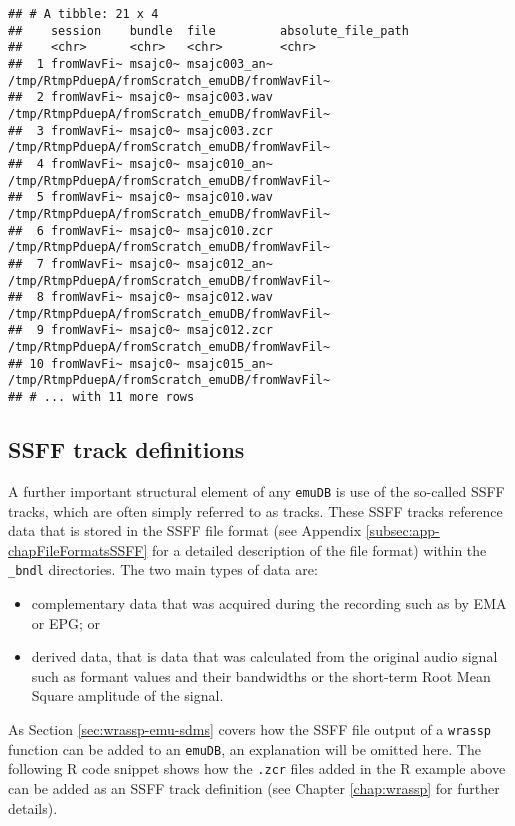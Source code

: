 \documentclass[
]{book}
\providecommand{\tightlist}{%
  \setlength{\itemsep}{0pt}\setlength{\parskip}{0pt}}
\begin{document}
\begin{verbatim}
## # A tibble: 21 x 4
##    session    bundle  file         absolute_file_path                           
##    <chr>      <chr>   <chr>        <chr>                                        
##  1 fromWavFi~ msajc0~ msajc003_an~ /tmp/RtmpPduepA/fromScratch_emuDB/fromWavFil~
##  2 fromWavFi~ msajc0~ msajc003.wav /tmp/RtmpPduepA/fromScratch_emuDB/fromWavFil~
##  3 fromWavFi~ msajc0~ msajc003.zcr /tmp/RtmpPduepA/fromScratch_emuDB/fromWavFil~
##  4 fromWavFi~ msajc0~ msajc010_an~ /tmp/RtmpPduepA/fromScratch_emuDB/fromWavFil~
##  5 fromWavFi~ msajc0~ msajc010.wav /tmp/RtmpPduepA/fromScratch_emuDB/fromWavFil~
##  6 fromWavFi~ msajc0~ msajc010.zcr /tmp/RtmpPduepA/fromScratch_emuDB/fromWavFil~
##  7 fromWavFi~ msajc0~ msajc012_an~ /tmp/RtmpPduepA/fromScratch_emuDB/fromWavFil~
##  8 fromWavFi~ msajc0~ msajc012.wav /tmp/RtmpPduepA/fromScratch_emuDB/fromWavFil~
##  9 fromWavFi~ msajc0~ msajc012.zcr /tmp/RtmpPduepA/fromScratch_emuDB/fromWavFil~
## 10 fromWavFi~ msajc0~ msajc015_an~ /tmp/RtmpPduepA/fromScratch_emuDB/fromWavFil~
## # ... with 11 more rows
\end{verbatim}

\hypertarget{ssff-track-definitions}{%
\subsection{SSFF track definitions}\label{ssff-track-definitions}}

A further important structural element of any \texttt{emuDB} is use of the so-called SSFF tracks, which are often simply referred to as tracks. These SSFF tracks reference data that is stored in the SSFF file format (see Appendix \ref{subsec:app-chapFileFormatsSSFF} for a detailed description of the file format) within the \texttt{\_bndl} directories. The two main types of data are:

\begin{itemize}
\tightlist
\item
  complementary data that was acquired during the recording such as by EMA or EPG; or
\item
  derived data, that is data that was calculated from the original audio signal such as formant values and their bandwidths or the short-term Root Mean Square amplitude of the signal.
\end{itemize}

As Section \ref{sec:wrassp-emu-sdms} covers how the SSFF file output of a \texttt{wrassp} function can be added to an \texttt{emuDB}, an explanation will be omitted here. The following R code snippet shows how the \texttt{.zcr} files added in the R example above can be added as an SSFF track definition (see Chapter \ref{chap:wrassp} for further details).
\end{document}
